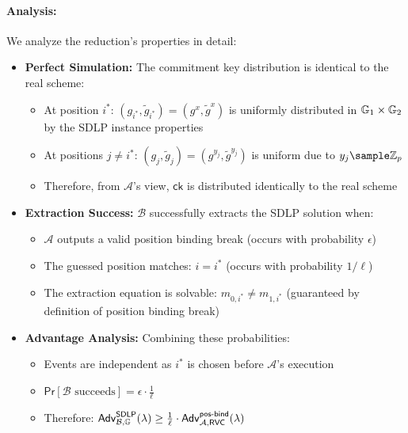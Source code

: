 \paragraph{Analysis:}
We analyze the reduction's properties in detail:
\begin{itemize}
    \item \textbf{Perfect Simulation:} The commitment key distribution is identical to the real scheme:
        \begin{itemize}
            \item At position $i^*$: $(g_{i^*}, \tilde{g}_{i^*}) = (g^x, \tilde{g}^x)$ is uniformly distributed in $\mathbb{G}_1 \times \mathbb{G}_2$ by the SDLP instance properties
            \item At positions $j \neq i^*$: $(g_j, \tilde{g}_j) = (g^{y_j}, \tilde{g}^{y_j})$ is uniform due to $y_j \sample \Z_p$
            \item Therefore, from $\mathcal{A}$'s view, $\mathsf{ck}$ is distributed identically to the real scheme
        \end{itemize}
    
    \item \textbf{Extraction Success:} $\mathcal{B}$ successfully extracts the SDLP solution when:
        \begin{itemize}
            \item $\mathcal{A}$ outputs a valid position binding break (occurs with probability $\epsilon$)
            \item The guessed position matches: $i = i^*$ (occurs with probability $1/\ell$)
            \item The extraction equation is solvable: $m_{0,i^*} \neq m_{1,i^*}$ (guaranteed by definition of position binding break)
        \end{itemize}
    
    \item \textbf{Advantage Analysis:} Combining these probabilities:
        \begin{itemize}
            \item Events are independent as $i^*$ is chosen before $\mathcal{A}$'s execution
            \item $\mathsf{Pr}[\mathcal{B} \text{ succeeds}] = \epsilon \cdot \frac{1}{\ell}$
            \item Therefore: $\mathsf{Adv}^{\mathsf{SDLP}}_{\mathcal{B},\mathbb{G}}(\lambda) \geq \frac{1}{\ell} \cdot \mathsf{Adv}^{\mathsf{pos\text{-}bind}}_{\mathcal{A},\mathsf{RVC}}(\lambda)$
        \end{itemize}
\end{itemize}

